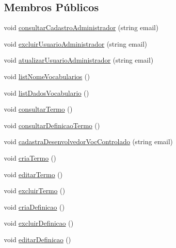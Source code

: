 \subsection*{Membros Públicos}
\begin{DoxyCompactItemize}
\item 
void \mbox{\hyperlink{class_servico_usuarios_administrador_ae1474bec1c712ba5640c83f4fe666fc4}{consultar\+Cadastro\+Administrador}} (string email)
\item 
void \mbox{\hyperlink{class_servico_usuarios_administrador_a1295e808f5e6322a8e329ff711b2b428}{excluir\+Usuario\+Administrador}} (string email)
\item 
void \mbox{\hyperlink{class_servico_usuarios_administrador_a1111b56d40dff5aa7186c4f3dfe2e598}{atualizar\+Usuario\+Administrador}} (string email)
\item 
void \mbox{\hyperlink{class_servico_usuarios_administrador_a72b7761474e413704531b3234744d0e0}{list\+Nome\+Vocabularios}} ()
\item 
void \mbox{\hyperlink{class_servico_usuarios_administrador_adddc69a01b3ffb101f3a0b5825dde223}{list\+Dados\+Vocabulario}} ()
\item 
void \mbox{\hyperlink{class_servico_usuarios_administrador_aec8b05b7c4a2fb318b6be8f6704d68eb}{consultar\+Termo}} ()
\item 
void \mbox{\hyperlink{class_servico_usuarios_administrador_acc178ea9b5ed289bde27ca853e874962}{consultar\+Definicao\+Termo}} ()
\item 
void \mbox{\hyperlink{class_servico_usuarios_administrador_a0a20923a2c556fa62587fac48b6e55da}{cadastra\+Desenvolvedor\+Voc\+Controlado}} (string email)
\item 
void \mbox{\hyperlink{class_servico_usuarios_administrador_a9002054e8a06338e2a380517b6aeb1f7}{cria\+Termo}} ()
\item 
void \mbox{\hyperlink{class_servico_usuarios_administrador_a219b135060f3a85d996f506474b99f48}{editar\+Termo}} ()
\item 
void \mbox{\hyperlink{class_servico_usuarios_administrador_a90abacb7bb051878e6b016d9993733c1}{excluir\+Termo}} ()
\item 
void \mbox{\hyperlink{class_servico_usuarios_administrador_a10298cc0f8e8c1b6f44363747bc8de1e}{cria\+Definicao}} ()
\item 
void \mbox{\hyperlink{class_servico_usuarios_administrador_a1c78a37ca8e92725926d3f13299a50b6}{excluir\+Definicao}} ()
\item 
void \mbox{\hyperlink{class_servico_usuarios_administrador_aa1bda96596ffda5676af7181eaae9466}{editar\+Definicao}} ()

\end{DoxyCompactItemize}
